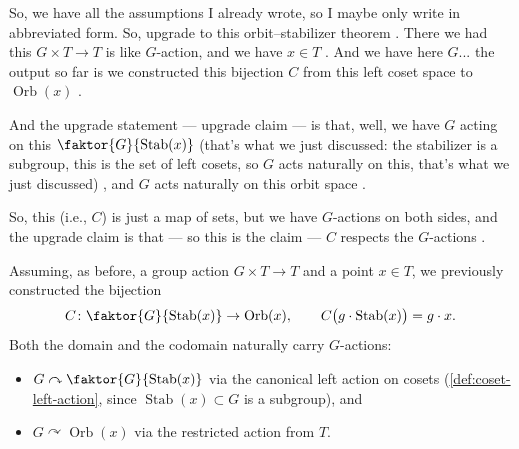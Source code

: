 \begin{speech}[00:14:29 - 00:16:01]
So, we have all the assumptions I already wrote, so I maybe only write in abbreviated form. So, upgrade to this orbit--stabilizer theorem . There we had this $G \times T \to T$ is like $G$-action, and we have $x \in T$ . And we have here $G$... the output so far is we constructed this bijection $C$ from this left coset space to $\operatorname{Orb}(x)$ .

And the upgrade statement --- upgrade claim  --- is that, well, we have $G$ acting on this $\faktor{G}{\operatorname{Stab}(x)}$ (that's what we just discussed: the stabilizer is a subgroup, this is the set of left cosets, so $G$ acts naturally on this, that's what we just discussed) , and $G$ acts naturally on this orbit space .

So, this (i.e., $C$) is just a map of sets, but we have $G$-actions on both sides, and the upgrade claim is that --- so this is the claim --- $C$ respects the $G$-actions .
\end{speech}

\begin{content}
Assuming, as before, a group action $G \times T \to T$ and a point $x \in T$, we previously constructed the bijection
\[
C \colon \faktor{G}{\operatorname{Stab}(x)} \to \operatorname{Orb}(x), \qquad C\bigl(g \cdot \operatorname{Stab}(x)\bigr) = g \cdot x.
\]
Both the domain and the codomain naturally carry $G$-actions:
\begin{itemize}
    \item $G \curvearrowright \faktor{G}{\operatorname{Stab}(x)}$ via the canonical left action on cosets (\cref{def:coset-left-action}, since $\operatorname{Stab}(x) \subset G$ is a subgroup), and
    \item $G \curvearrowright \operatorname{Orb}(x)$ via the restricted action from $T$.
\end{itemize}

\end{content}

